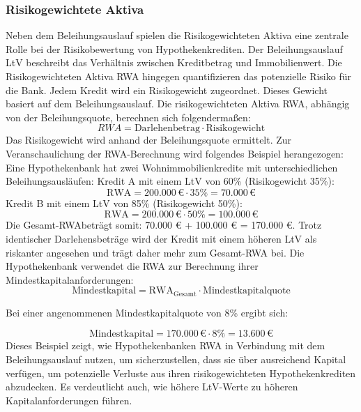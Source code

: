 \subsubsection{Risikogewichtete Aktiva}
Neben dem Beleihungsauslauf spielen die Risikogewichteten Aktiva eine zentrale Rolle bei der Risikobewertung von Hypothekenkrediten. Der Beleihungsauslauf \ac{LtV} beschreibt das Verhältnis zwischen Kreditbetrag und Immobilienwert. Die Risikogewichteten Aktiva \acs{RWA} hingegen quantifizieren das potenzielle Risiko für die Bank. Jedem Kredit wird ein Risikogewicht zugeordnet. Dieses Gewicht basiert auf dem Beleihungsauslauf. Die risikogewichteten Aktiva \acs{RWA}, abhängig von der Beleihungsquote, berechnen sich folgendermaßen:
\begin{equation}
    RWA = \text{Darlehenbetrag} \cdot \text{Risikogewicht}
\end{equation}
Das Risikogewicht wird anhand der Beleihungsquote ermittelt.
Zur Veranschaulichung der RWA-Berechnung wird folgendes Beispiel herangezogen:
Eine Hypothekenbank hat zwei Wohnimmobilienkredite mit unterschiedlichen Beleihungsausläufen:
Kredit A mit einem \ac{LtV} von 60\% (Risikogewicht 35\%):  
\[
\text{RWA} = 200.000 \, \text{€} \cdot 35\% = 70.000 \, \text{€}
\]  
Kredit B mit einem \ac{LtV} von 85\% (Risikogewicht 50\%):  
\[
\text{RWA} = 200.000 \, \text{€} \cdot 50\% = 100.000 \, \text{€}
\]
Die Gesamt-\acs{RWA}beträgt somit: 70.000 € + 100.000 € = 170.000 €.  
Trotz identischer Darlehensbeträge wird der Kredit mit einem höheren \ac{LtV} als riskanter angesehen und trägt daher mehr zum Gesamt-\acs{RWA} bei.
Die Hypothekenbank verwendet die \acs{RWA} zur Berechnung ihrer Mindestkapitalanforderungen:
\begin{equation}
    \text{Mindestkapital} = \text{RWA}_{\text{Gesamt}} \cdot \text{Mindestkapitalquote}
    \label{eq:min_capital}
    \end{equation}
    
    Bei einer angenommenen Mindestkapitalquote von 8\% ergibt sich:
    
    \begin{equation*}
    \text{Mindestkapital} = 170.000 \, \text{€} \cdot 8\% = 13.600 \, \text{€}
    \end{equation*}
Dieses Beispiel zeigt, wie Hypothekenbanken \acs{RWA} in Verbindung mit dem Beleihungsauslauf nutzen, um sicherzustellen, dass sie über ausreichend Kapital verfügen, um potenzielle Verluste aus ihren risikogewichteten Hypothekenkrediten abzudecken. Es verdeutlicht auch, wie höhere \ac{LtV}-Werte zu höheren Kapitalanforderungen führen.
